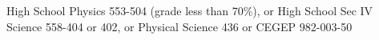 {High School Physics 553-504 (grade less than 70\%), or High School Sec IV Science 558-404 or 402, or Physical Science 436 or CEGEP 982-003-50}